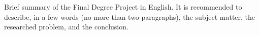 
Brief summary of the Final Degree Project in English. It is recommended to describe, in a few words (no more than two paragraphs), the subject matter, the researched problem, and the conclusion.